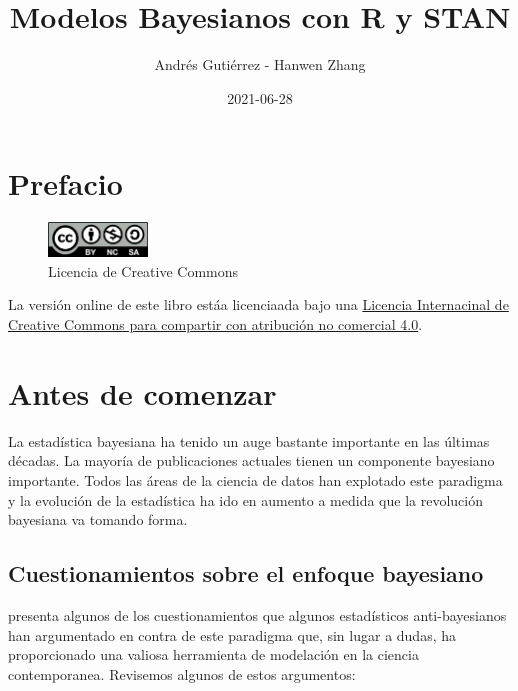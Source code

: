 \documentclass[
  10pt,
  spanish,
]{book}
\title{Modelos Bayesianos con R y STAN}
\author{Andrés Gutiérrez - Hanwen Zhang}
\date{2021-06-28}
\theoremstyle{definition}
\theoremstyle{definition}
\theoremstyle{definition}
\theoremstyle{definition}
\theoremstyle{remark}
\begin{document}
\maketitle

{
\hypersetup{linkcolor=}
\setcounter{tocdepth}{1}
\tableofcontents
}
\listoftables
\listoffigures
\hypertarget{prefacio}{%
\chapter*{Prefacio}\label{prefacio}}

\begin{figure}
\includegraphics[width=100px]{Pics/CClicence} \caption{Licencia de Creative Commons}\label{fig:unnamed-chunk-1}
\end{figure}

La versión online de este libro estáa licenciaada bajo una \href{http://creativecommons.org/licenses/by-nc-sa/4.0/}{Licencia Internacinal de Creative Commons para compartir con atribución no comercial 4.0}.

\hypertarget{antes-de-comenzar}{%
\chapter*{Antes de comenzar}\label{antes-de-comenzar}}

La estadística bayesiana ha tenido un auge bastante importante en las últimas décadas. La mayoría de publicaciones actuales tienen un componente bayesiano importante. Todos las áreas de la ciencia de datos han explotado este paradigma y la evolución de la estadística ha ido en aumento a medida que la revolución bayesiana va tomando forma.

\hypertarget{cuestionamientos-sobre-el-enfoque-bayesiano}{%
\section*{Cuestionamientos sobre el enfoque bayesiano}\label{cuestionamientos-sobre-el-enfoque-bayesiano}}

\citet{GelmanObjections} presenta algunos de los cuestionamientos que algunos estadísticos anti-bayesianos han argumentado en contra de este paradigma que, sin lugar a dudas, ha proporcionado una valiosa herramienta de modelación en la ciencia contemporanea. Revisemos algunos de estos argumentos:
\end{document}
